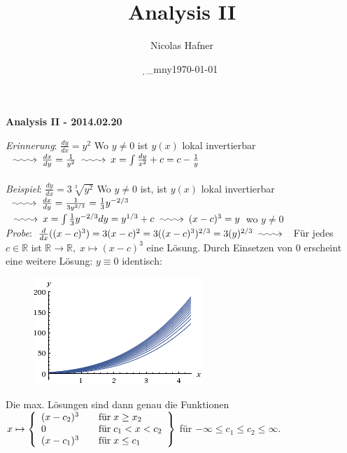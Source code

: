 \documentclass[12pt,a4paper,titlepage]{article}
\author{Nicolas Hafner}
\title{Analysis II}
\date{\d_mny\today}
\makeatletter
\newcommand{\longsquiggly}{\xymatrix{{}\ar@{~>}[r]&{}}}
\makeatother
\begin{document}
	
\begin{center}{\bfseries\Huge Analysis II - 2014.02.20}\end{center}
\textit{Erinnerung}: $\frac{dy}{dx}=y^2$ Wo $y\neq0$ ist $y(x)$ lokal invertierbar \\
$\longsquiggly \frac{dx}{dy}=\frac{1}{y^2} \longsquiggly x=\int\frac{dy}{x^2}+c=c-\frac{1}{y}$ \\
\\
\textit{Beispiel}: $\frac{dy}{dx}=3\sqrt[3]{y^2}$ Wo $y\neq0$ ist, ist $y(x)$ lokal invertierbar $\longsquiggly \frac{dx}{dy}=\frac{1}{3y^{2/3}}=\frac{1}{3}y^{-2/3} $\\
$\longsquiggly x=\int\frac{1}{3}y^{-2/3}dy=y^{1/3}+c \longsquiggly (x-c)^3=y$ wo $y\neq0$ \\
\textit{Probe}: $\frac{d}{dx}((x-c)^3) = 3(x-c)^2 = 3((x-c)^3)^{2/3}=3(y)^{2/3} \longsquiggly$ Für jedes $c\in\mathbb{R}$ ist $\mathbb{R}\to\mathbb{R},\; x\mapsto(x-c)^3$ eine Lösung. Durch Einsetzen von $0$ erscheint eine weitere Lösung: $y\equiv 0$ identisch:\\
\begin{figure}[H]\centering\includegraphics{WolframAlpha--dy_dx_3y__2_3___Sample_solution_family__2014_02_20_0332.png}\end{figure}
Die max. Lösungen sind dann genau die Funktionen $x\mapsto\left\{\begin{array}{l l}
    (x-c_2)^3 & \quad \text{für}\; x\geq x_2 \\
    0 & \quad \text{für}\; c_1<x<c_2 \\
    (x-c_1)^3 & \quad \text{für}\; x\leq c_1 \\
  \end{array}\right\}$ für $-\infty\leq c_1\leq c_2\leq\infty$.
\end{document}
